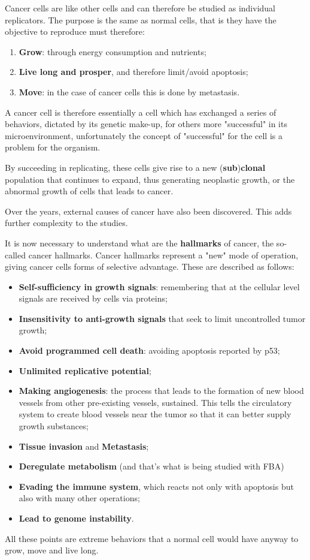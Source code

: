 Cancer cells are like other cells and can therefore be studied as individual replicators.
The purpose is the same as normal cells, that is they have the objective to reproduce must
therefore:
\begin{enumerate}
    \item \textbf{Grow}: through energy consumption and nutrients;
    \item \textbf{Live long and prosper}, and therefore limit/avoid apoptosis;
    \item \textbf{Move}: in the case of cancer cells this is done by metastasis.
\end{enumerate}
A cancer cell is therefore essentially a cell which has exchanged a series of behaviors,
dictated by its genetic make-up, for others more "successful" in its microenvironment,
unfortunately the concept of "successful" for the cell is a problem for the organism.

By succeeding in replicating, these cells give rise to a new (\textbf{sub})\textbf{clonal}
population that continues to expand, thus generating neoplastic growth, or the abnormal
growth of cells that leads to cancer.

Over the years, external causes of cancer have also been discovered. This adds further
complexity to the studies.

It is now necessary to understand what are the \textbf{hallmarks} of cancer, the so-called
cancer hallmarks. Cancer hallmarks represent a "new" mode of operation, giving cancer cells
forms of selective advantage. These are described as follows:
\begin{itemize}
    \item \textbf{Self-sufficiency in growth signals}: remembering that at the cellular level
          signals are received by cells via proteins;
    \item \textbf{Insensitivity to anti-growth signals} that seek to limit uncontrolled tumor
          growth;
    \item \textbf{Avoid programmed cell death}: avoiding apoptosis reported by p53;
    \item \textbf{Unlimited replicative potential};
    \item \textbf{Making angiogenesis}: the process that leads to the formation of new blood
          vessels from other pre-existing vessels, sustained. This tells the circulatory system to
          create blood vessels near the tumor so that it can better supply growth substances;
    \item \textbf{Tissue invasion} and \textbf{Metastasis};
    \item \textbf{Deregulate metabolism} (and that's what is being studied with FBA)
    \item \textbf{Evading the immune system}, which reacts not only with apoptosis but also
          with many other operations;
    \item \textbf{Lead to genome instability}.
\end{itemize}
All these points are extreme behaviors that a normal cell would have anyway to grow, move
and live long.

